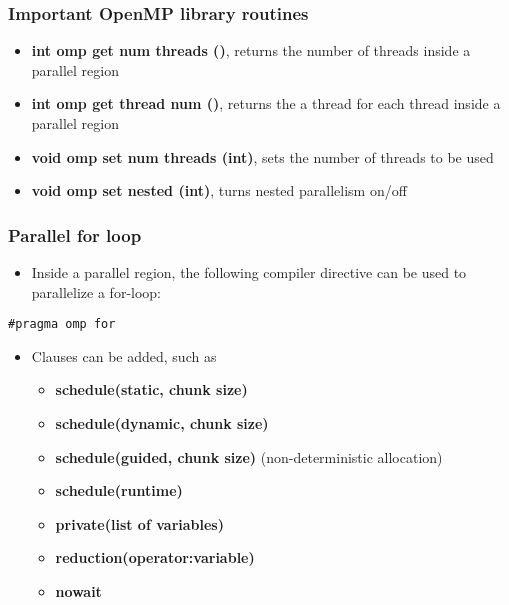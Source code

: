 \documentclass{beamer}
\begin{document}
\begin{frame}
\frametitle{Important OpenMP library routines}

\begin{block}{}

\begin{itemize}
\item \textbf{int omp get num threads ()}, returns the number of threads inside a parallel region

\item \textbf{int omp get thread num ()},  returns the  a thread for each thread inside a parallel region

\item \textbf{void omp set num threads (int)}, sets the number of threads to be used

\item \textbf{void omp set nested (int)},  turns nested parallelism on/off
\end{itemize}

\noindent
\end{block}
\end{frame}

\begin{frame}
\frametitle{Parallel for loop}

\begin{block}{}
\begin{itemize}
 \item Inside a parallel region, the following compiler directive can be used to parallelize a for-loop:
\end{itemize}

\noindent
\begin{verbatim}
#pragma omp for
\end{verbatim}
\begin{itemize}
\item Clauses can be added, such as
\begin{itemize}

  \item \textbf{schedule(static, chunk size)}

  \item \textbf{schedule(dynamic, chunk size)} 

  \item \textbf{schedule(guided, chunk size)} (non-deterministic allocation)

  \item \textbf{schedule(runtime)}

  \item \textbf{private(list of variables)}

  \item \textbf{reduction(operator:variable)}

  \item \textbf{nowait}
\end{itemize}

\noindent
\end{itemize}

\noindent
\end{block}
\end{frame}
\end{document}
